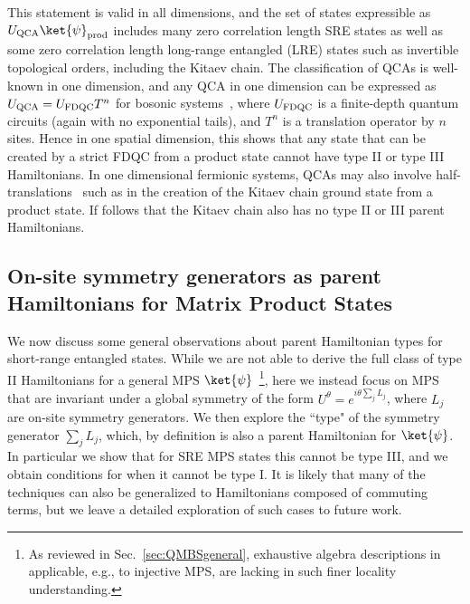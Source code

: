 \documentclass[prx,letterpaper,aps,superscriptaddress,floatfix,twocolumn,nofootinbib]{revtex4-2}
\theoremstyle{definition}
\begin{document}
%
This statement is valid in all dimensions, and the set of states expressible as $U_{\rm QCA}\ket{\psi}_{\rm prod}$ includes many zero correlation length SRE states as well as some zero correlation length long-range entangled (LRE) states such as invertible topological orders, including the Kitaev chain.
%
The classification of QCAs is well-known in one dimension, and any QCA in one dimension can be expressed as $U_{\rm QCA} = U_{\rm FDQC} T^n$ for bosonic systems~\cite{GrossNesmeVogtsWerner2012}, where $U_{\rm FDQC}$ is a finite-depth quantum circuits (again with no exponential tails), and $T^n$ is a translation operator by $n$ sites.
%
Hence in one spatial dimension, this shows that any state that can be created by a strict FDQC from a product state cannot have type II or type III Hamiltonians. In one dimensional fermionic systems, QCAs may also involve half-translations~\cite{Po2017RadicalChiralFloquet,PoFidkowskiMorimotoPotterVishwanath2016PRX} such as in the creation of the Kitaev chain ground state from a product state. If follows that the Kitaev chain also has no type II or III parent Hamiltonians.
%

%
\subsection{On-site symmetry generators as parent Hamiltonians for Matrix Product States}
%
We now discuss some general observations about parent Hamiltonian types for short-range entangled states.
%
While we are not able to derive the full class of type II Hamiltonians for a general MPS $\ket{\psi}$~\footnote{
As reviewed in Sec.~\ref{sec:QMBSgeneral}, exhaustive algebra descriptions in~\cite{moudgalya2023exhaustive} applicable, e.g., to injective MPS, are lacking in such finer locality understanding.}, here we instead focus on MPS that are invariant under a global symmetry of the form $U^\theta = e^{i \theta \sum_j L_j}$, where $L_j$ are on-site symmetry generators.
%
We then explore the ``type" of the symmetry generator $\sum_j{L_j}$, which, by definition is also a parent Hamiltonian for $\ket{\psi}$. 
%
In particular we show that for SRE MPS states this cannot be type III, and we obtain conditions for when it cannot be type I.
%
It is likely that many of the techniques can also be generalized to Hamiltonians composed of commuting terms, but we leave a detailed exploration of such cases to future work.  
%
\end{document}

